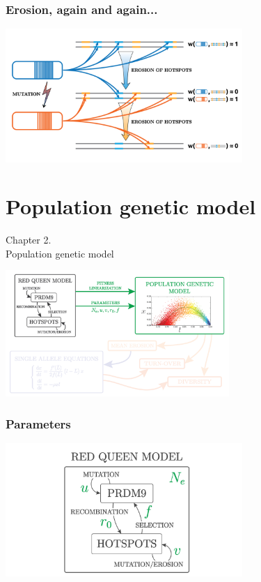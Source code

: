 \documentclass[10pt]{beamer}
\begin{document}
\begin{frame}
\frametitle{Erosion, again and again...}
	\begin{center}
       \includegraphics[width=9cm]{Images/red-queen-5.png}
	\end{center}
\end{frame}

\section{Population genetic model}

\begin{frame}
	\begin{center}
	\huge
	Chapter 2. \\
       Population genetic model
	\end{center}
\end{frame}

\begin{frame}
	\begin{center}
       \includegraphics[width=8.5cm]{Images/overline-2.png}
	\end{center}
\end{frame}

\begin{frame}
	\frametitle{Parameters}
	\begin{center}
       \includegraphics[width=9cm]{Images/red-queen-model.jpg}
	\end{center}
\end{frame}
\end{document}
